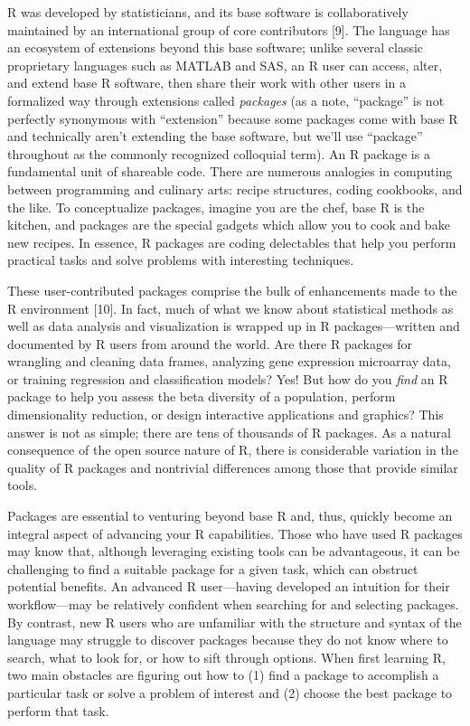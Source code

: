 \documentclass[10pt,letterpaper]{article}
\begin{document}
R was developed by statisticians, and its base software is
collaboratively maintained by an international group of core
contributors {[}9{]}. The language has an ecosystem of extensions beyond
this base software; unlike several classic proprietary languages such as
MATLAB and SAS, an R user can access, alter, and extend base R software,
then share their work with other users in a formalized way through
extensions called \emph{packages} (as a note, ``package'' is not
perfectly synonymous with ``extension'' because some packages come with
base R and technically aren't extending the base software, but we'll use
``package'' throughout as the commonly recognized colloquial term). An R
package is a fundamental unit of shareable code. There are numerous
analogies in computing between programming and culinary arts: recipe
structures, coding cookbooks, and the like. To conceptualize packages,
imagine you are the chef, base R is the kitchen, and packages are the
special gadgets which allow you to cook and bake new recipes. In
essence, R packages are coding delectables that help you perform
practical tasks and solve problems with interesting techniques.

These user-contributed packages comprise the bulk of enhancements made
to the R environment {[}10{]}. In fact, much of what we know about
statistical methods as well as data analysis and visualization is
wrapped up in R packages---written and documented by R users from around
the world. Are there R packages for wrangling and cleaning data frames,
analyzing gene expression microarray data, or training regression and
classification models? Yes! But how do you \emph{find} an R package to
help you assess the beta diversity of a population, perform
dimensionality reduction, or design interactive applications and
graphics? This answer is not as simple; there are tens of thousands of R
packages. As a natural consequence of the open source nature of R, there
is considerable variation in the quality of R packages and nontrivial
differences among those that provide similar tools.

Packages are essential to venturing beyond base R and, thus, quickly
become an integral aspect of advancing your R capabilities. Those who
have used R packages may know that, although leveraging existing tools
can be advantageous, it can be challenging to find a suitable package
for a given task, which can obstruct potential benefits. An advanced R
user---having developed an intuition for their workflow---may be
relatively confident when searching for and selecting packages. By
contrast, new R users who are unfamiliar with the structure and syntax
of the language may struggle to discover packages because they do not
know where to search, what to look for, or how to sift through options.
When first learning R, two main obstacles are figuring out how to (1)
find a package to accomplish a particular task or solve a problem of
interest and (2) choose the best package to perform that task.
\end{document}
